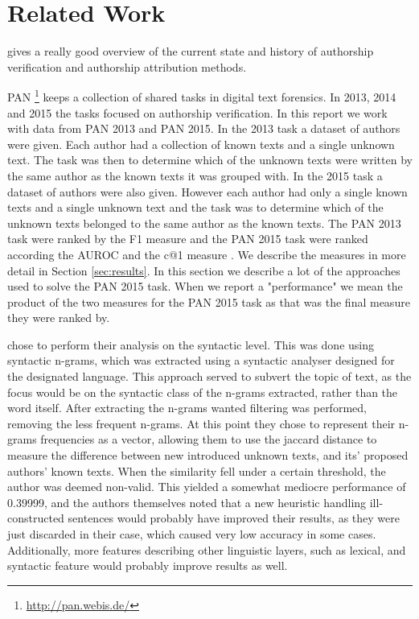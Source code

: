 \section{Related Work}
\cite{stamatos2009} gives a really good overview of the current state and
history of authorship verification and authorship attribution methods.

PAN \footnote{\url{http://pan.webis.de/}} keeps a collection of shared tasks in
digital text forensics. In 2013, 2014 and 2015 the tasks focused on authorship
verification. In this report we work with data from PAN 2013 and PAN 2015. In
the 2013 task a dataset of authors were given. Each author had a collection of
known texts and a single unknown text. The task was then to determine which of
the unknown texts were written by the same author as the known texts it was
grouped with. In the 2015 task a dataset of authors were also given. However
each author had only a single known texts and a single unknown text and the task
was to determine which of the unknown texts belonged to the same author as the
known texts. The PAN 2013 task were ranked by the F1 measure and the PAN 2015
task were ranked according the \gls{AUROC} and the c@1 measure \cite{penas2011}.
We describe the measures in more detail in Section \ref{sec:results}. In this
section we describe a lot of the approaches used to solve the PAN 2015 task.
When we report a "performance" we mean the product of the two measures for the
PAN 2015 task as that was the final measure they were ranked by.

\cite{juanpablo2015} chose to perform their analysis on the syntactic level.
This was done using syntactic n-grams, which was extracted using a syntactic
analyser designed for the designated language. This approach served to subvert
the topic of text, as the focus would be on the syntactic class of the n-grams
extracted, rather than the word itself. After extracting the n-grams wanted
filtering was performed, removing the less frequent n-grams. At this point
they chose to represent their n-grams frequencies as a vector, allowing them
to use the jaccard distance to measure the difference between new introduced
unknown texts, and its' proposed authors' known texts. When the similarity fell
under a certain threshold, the author was deemed non-valid. This yielded a
somewhat mediocre performance of 0.39999, and the authors themselves noted that
a new heuristic handling ill-constructed sentences would probably have improved
their results, as they were just discarded in their case, which caused very low
accuracy in some cases. Additionally, more features describing other linguistic
layers, such as lexical, and syntactic feature would probably improve results as
well.

